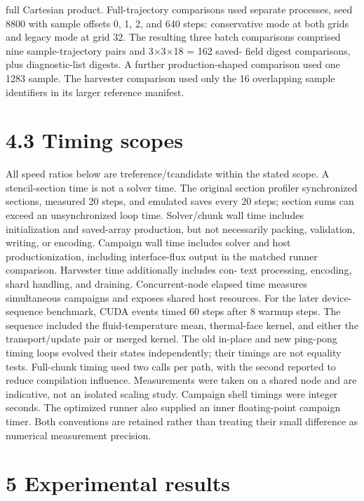 \documentclass[11pt]{article}
\begin{document}
full Cartesian product. Full-trajectory comparisons used separate processes, seed 8800 with sample
offsets 0, 1, 2, and 640 steps: conservative mode at both grids and legacy mode at grid 32. The
resulting three batch comparisons comprised nine sample-trajectory pairs and 3\ensuremath{\times}3\ensuremath{\times}18 = 162 saved-
field digest comparisons, plus diagnostic-list digests. A further production-shaped comparison used
one 1283 sample. The harvester comparison used only the 16 overlapping sample identifiers in its
larger reference manifest.

\section*{4.3 Timing scopes}

All speed ratios below are treference/tcandidate within the stated scope. A stencil-section time is not
a solver time. The original section profiler synchronized sections, measured 20 steps, and emulated
saves every 20 steps; section sums can exceed an unsynchronized loop time. Solver/chunk wall
time includes initialization and saved-array production, but not necessarily packing, validation,
writing, or encoding. Campaign wall time includes solver and host productionization, including
interface-flux output in the matched runner comparison. Harvester time additionally includes con-
text processing, encoding, shard handling, and draining. Concurrent-node elapsed time measures
simultaneous campaigns and exposes shared host resources.
For the later device-sequence benchmark, CUDA events timed 60 steps after 8 warmup steps. The
sequence included the fluid-temperature mean, thermal-face kernel, and either the transport/update
pair or merged kernel. The old in-place and new ping-pong timing loops evolved their states
independently; their timings are not equality tests. Full-chunk timing used two calls per path, with
the second reported to reduce compilation influence. Measurements were taken on a shared node
and are indicative, not an isolated scaling study.
Campaign shell timings were integer seconds. The optimized runner also supplied an inner
floating-point campaign timer. Both conventions are retained rather than treating their small
difference as numerical measurement precision.

\section*{5 Experimental results}
\end{document}
